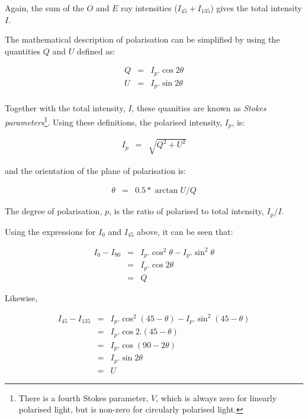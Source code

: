 Again, the sum of the $O$ and $E$ ray intensities ($I_{45}+I_{135}$)
gives the total intensity $I$. 

The mathematical description of polarisation can be simplified by using 
the quantities $Q$ and $U$ defined as:

\begin{eqnarray*}
  Q & = & I_{p}.\cos 2\theta \\
  U & = & I_{p}.\sin 2\theta \\
\end{eqnarray*}

Together with the total intensity, $I$, these quanities are known as 
{\em Stokes parameters}\footnote{There is a fourth Stokes parameter, $V$, which is
always zero for linearly polarised light, but is non-zero for circularly
polarised light.}. Using these definitions, the polarised intensity, $I_{p}$, 
is:

\begin{eqnarray*}
  I_{p} & = & \sqrt{ Q^{2} + U^{2} }
\end{eqnarray*}

and the orientation of the plane of polarisation is:

\begin{eqnarray*}
  \theta & = & 0.5*\arctan U/Q
\end{eqnarray*}

The degree of polarisation, $p$, is the ratio of polarised to total
intensity, $I_{p}/I$.

Using the expressions for $I_{0}$ and $I_{45}$ above, it can be seen that:

\begin{eqnarray*}
  I_{0} - I_{90} & = & I_{p}.\cos^{2}\theta - I_{p}.\sin^{2}\theta \\
                 & = & I_{p}.\cos 2\theta \\
                 & = & Q
\end{eqnarray*}

Likewise,

\begin{eqnarray*}
  I_{45} - I_{135} & = & I_{p}.\cos^{2}(45 - \theta) - I_{p}.\sin^{2}(45 - \theta) \\
                   & = & I_{p}.\cos 2.(45 - \theta) \\
                   & = & I_{p}.\cos (90 - 2\theta) \\
                   & = & I_{p}.\sin 2\theta \\
                   & = & U
\end{eqnarray*}

